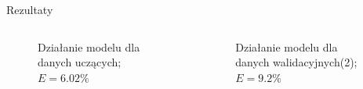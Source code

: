 \documentclass{beamer}
\begin{document}
\begin{frame}{Rezultaty}
\begin{columns}
	\begin{figure}
		\centering
		\caption{Działanie modelu dla danych uczących; $E=6.02\%$}
	\end{figure}
	
	\begin{figure}
		\centering
		\caption{Działanie modelu dla danych walidacyjnych(2); $E=9.2\%$}
	\end{figure}
\end{columns}
\end{frame}
\end{document}
